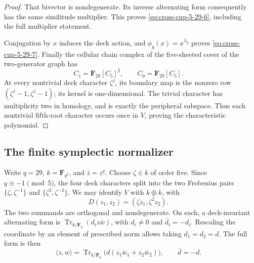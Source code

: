 \begin{proof}
That bivector is nondegenerate. Its inverse alternating
form consequently has the same similitude multiplier.
This proves \eqref{eq:cross-cup-5-29-6}, including the full multiplier statement.

Conjugation by \(x\) induces the deck action, and
\(\phi_g(x)=x^{\lambda_g}\) proves \eqref{eq:cross-cup-5-29-7}.
Finally the cellular chain complex of the five-sheeted
cover of the two-generator graph has
\[
 C_1=\mathbf F_{29}[C_5]^2,\qquad C_0=\mathbf F_{29}[C_5].
\]
At every nontrivial deck character \(\zeta^j\), its
boundary map is the nonzero row
\((\zeta^j-1,\zeta^j-1)\); its kernel is one-dimensional.
The trivial character has multiplicity two in homology,
and is exactly the peripheral subspace.
Thus each nontrivial fifth-root character occurs once
in \(V\), proving the characteristic polynomial.
\end{proof}

\subsection{The finite symplectic normalizer}

Write \(q=29\), \(k=\mathbf F_{q^2}\), and
\(\bar z=z^q\). Choose \(\zeta\in k\) of order five.
Since \(q\equiv-1\pmod5\), the four deck characters
split into the two Frobenius pairs
\(\{\zeta,\zeta^{-1}\}\) and
\(\{\zeta^2,\zeta^{-2}\}\).
We may identify \(V\) with \(k\oplus k\), with
\begin{equation}
                         D(z_1,z_2)=(\zeta z_1,\zeta^2z_2).
                                                               \label{eq:cross-cup-5-29-10}
\end{equation}
The two summands are orthogonal and nondegenerate.
On each, a deck-invariant alternating form is
\(\operatorname{Tr}_{k/\mathbf F_q}(d_i z\bar w)\),
with \(d_i\ne0\) and \(\bar d_i=-d_i\).
Rescaling the coordinate by an element of prescribed
norm allows taking \(d_1=d_2=d\).
The full form is then
\begin{equation}
 \langle z,w\rangle
 =\operatorname{Tr}_{k/\mathbf F_q}
       \bigl(d(z_1\bar w_1+z_2\bar w_2)\bigr),
 \qquad \bar d=-d.                                        \label{eq:cross-cup-5-29-11}
\end{equation}

